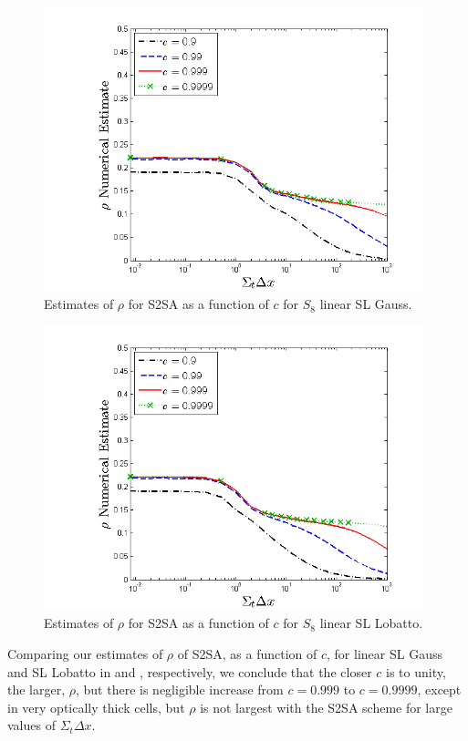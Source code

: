 %
%
\begin{figure}[!hbp]
\centering
\includegraphics[width=11cm]{chapter4_acceleration/Constant_XS_c_comparions_S2SA_Gauss.png}
\caption{Estimates of $\rho$ for S2SA as a function of $c$  for  $S_8$  linear SL Gauss.}
\label{fig:s2sa_gauss_as_fun_c}
\end{figure}
%
%
\begin{figure}[!htp]
\centering
\includegraphics[width=11cm]{chapter4_acceleration/Constant_XS_c_comparions_S2SA_Lobatto.png}
\caption{Estimates of $\rho$ for S2SA as a function of $c$  for  $S_8$  linear SL Lobatto.}
\label{fig:s2sa_lobatto_as_fun_c}
\end{figure}
%
%
Comparing our estimates of $\rho$ of S2SA, as a function of $c$, for linear SL Gauss and SL Lobatto in  and , respectively, we  conclude that the closer $c$ is to unity, the larger, $\rho$, but there is negligible increase from $c=0.999$ to $c=0.9999$, except in very optically thick cells, but $\rho$ is not largest with the S2SA scheme for large values of $\Sigma_t \Delta x$.  
